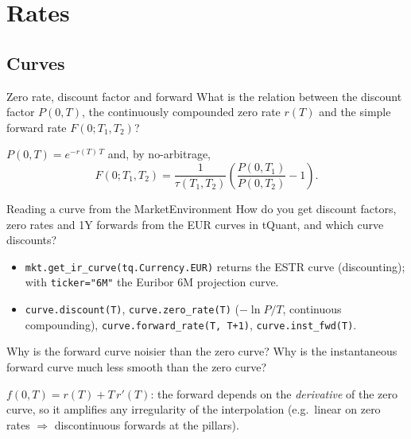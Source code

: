\section{Rates}\label{sec:rates}

\subsection{Curves}

\begin{question}{\Theory {}}{Zero rate, discount factor and forward}
What is the relation between the discount factor $P(0,T)$, the continuously
compounded zero rate $r(T)$ and the simple forward rate $F(0;T_1,T_2)$?
\end{question}
\begin{answer}
$P(0,T) = e^{-r(T)\,T}$ and, by no-arbitrage,
\[
  F(0;T_1,T_2) = \frac{1}{\tau(T_1,T_2)}\left(\frac{P(0,T_1)}{P(0,T_2)} - 1\right).
\]
\end{answer}

\begin{question}{\Practice {}}{Reading a curve from the MarketEnvironment}
How do you get discount factors, zero rates and 1Y forwards from the EUR curves in tQuant, and which curve
discounts?
\end{question}
\begin{answer}
\begin{itemize}[nosep]
  \item \texttt{mkt.get\_ir\_curve(tq.Currency.EUR)} returns the ESTR curve (discounting);
        with \texttt{ticker="6M"} the Euribor 6M projection curve.
  \item \texttt{curve.discount(T)}, \texttt{curve.zero\_rate(T)} ($-\ln P/T$, continuous compounding),
        \texttt{curve.forward\_rate(T, T+1)}, \texttt{curve.inst\_fwd(T)}.
\end{itemize}
\end{answer}

\begin{question}{\Theory {}}{Why is the forward curve noisier than the zero curve?}
Why is the instantaneous forward curve much less smooth than the zero curve?
\end{question}
\begin{answer}
$f(0,T) = r(T) + T\,r'(T)$: the forward depends on the \emph{derivative} of the
zero curve, so it amplifies any irregularity of the interpolation (e.g.\ linear
on zero rates $\Rightarrow$ discontinuous forwards at the pillars).
\end{answer}

